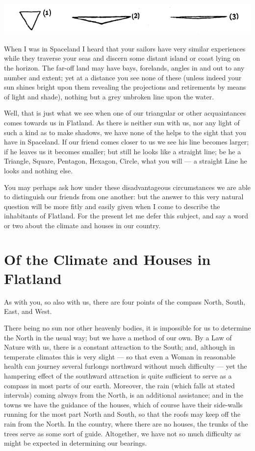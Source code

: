 \documentclass[12pt, a4paper, oneside]{memoir}
\begin{document}
\includegraphics[trim=20mm 0mm 0mm 0mm,width=\linewidth]{fig1}

When I was in Spaceland I heard that your sailors have very similar
experiences while they traverse your seas and discern some distant island or
coast lying on the horizon. The far-off land may have bays, forelands, angles
in and out to any number and extent; yet at a distance you see none of these
(unless indeed your sun shines bright upon them revealing the projections and
retirements by means of light and shade), nothing but a grey unbroken line
upon the water.

Well, that is just what we see when one of our triangular or other
acquaintances comes towards us in Flatland. As there is neither sun with us,
nor any light of such a kind as to make shadows, we have none of the helps to
the sight that you have in Spaceland. If our friend comes closer to us we see
his line becomes larger; if he leaves us it becomes smaller; but still he
looks like a straight line; be he a Triangle, Square, Pentagon, Hexagon,
Circle, what you will --- a straight Line he looks and nothing else.

You may perhaps ask how under these disadvantageous circumstances we are able
to distinguish our friends from one another: but the answer to this very
natural question will be more fitly and easily given when I come to describe
the inhabitants of Flatland. For the present let me defer this subject, and
say a word or two about the climate and houses in our country.










\chapter{Of the Climate and Houses in Flatland}
As with you, so also with us, there are four points of the compass North,
South, East, and West.

There being no sun nor other heavenly bodies,
it is impossible for us to determine the North in the usual way; but we have a
method of our own. By a Law of Nature with us, there is a constant attraction
to the South; and, although in temperate climates this is very slight --- so
that even a Woman in reasonable health can journey several furlongs northward
without much difficulty --- yet the hampering effect of the southward attraction
is quite sufficient to serve as a compass in most parts of our earth.
Moreover, the rain (which falls at stated intervals) coming always from the
North, is an additional assistance; and in the towns we have the guidance of
the houses, which of course have their side-walls running for the most part
North and South, so that the roofs may keep off the rain from the North. In
the country, where there are no houses, the trunks of the trees serve as some
sort of guide. Altogether, we have not so much difficulty as might be expected
in determining our bearings.
\end{document}
